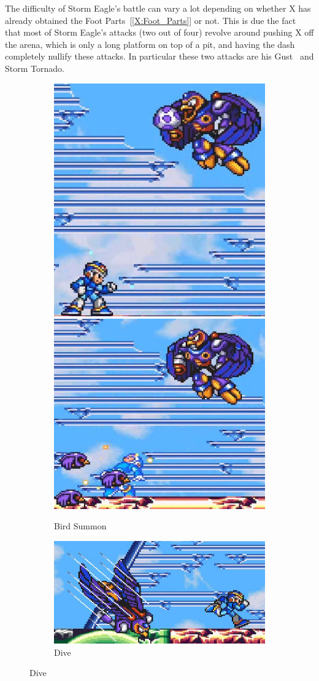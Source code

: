 The difficulty of Storm Eagle's battle can vary a lot depending on whether X has already obtained the Foot Parts~[\ref{X:Foot_Parts}] or not. This is due the fact that most of Storm Eagle's attacks (two out of four) revolve around pushing X off the arena, which is only a long platform on top of a pit, and having the dash completely nullify these attacks. In particular these two attacks are his Gust~\cite{wiki:Storm_eagle} and Storm Tornado.
\begin{figure}[htp]
	\centering
	\begin{subfigure}{\linewidth}
		\centering
		\includegraphics[width=0.25\linewidth]{figures/X1/Storm_eagle/Eagle_egg_1.jpg}
		\includegraphics[width=0.3\linewidth]{figures/X1/Storm_eagle/Eagle_egg_2.jpg}
		\caption{Bird Summon}
	\end{subfigure}
	\begin{subfigure}{0.35\linewidth}
		\centering
		\includegraphics[width=\linewidth]{figures/X1/Storm_eagle/Eagle_dive.jpg}
		\caption{Dive}

\end{subfigure}
\end{figure}
